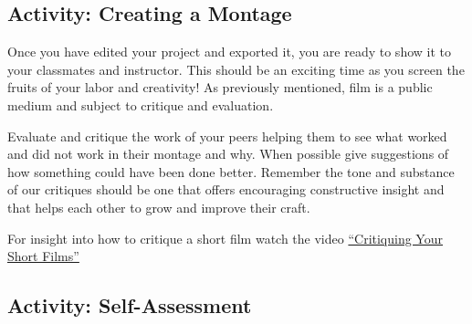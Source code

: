 \documentclass[
]{book}
\begin{document}
\hypertarget{activity-creating-a-montage}{%
\subsection*{Activity: Creating a Montage}\label{activity-creating-a-montage}}

\begin{reflect}
Once you have edited your project and exported it, you are ready to show it to your classmates and instructor. This should be an exciting time as you screen the fruits of your labor and creativity! As previously mentioned, film is a public medium and subject to critique and evaluation.

Evaluate and critique the work of your peers helping them to see what worked and did not work in their montage and why. When possible give suggestions of how something could have been done better. Remember the tone and substance of our critiques should be one that offers encouraging constructive insight and that helps each other to grow and improve their craft.

For insight into how to critique a short film watch the video \href{https://www.youtube.com/watch?v=x5ASDkOSIBE}{``Critiquing Your Short Films''}
\end{reflect}

\hypertarget{activity-self-assessment}{%
\subsection*{Activity: Self-Assessment}\label{activity-self-assessment}}
\end{document}
